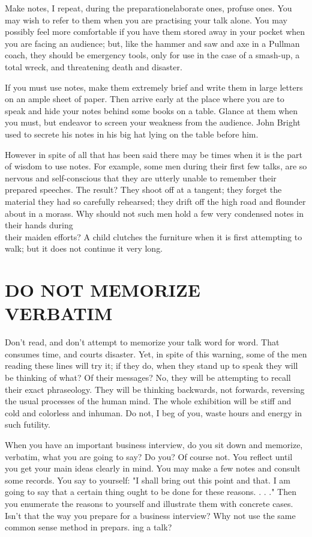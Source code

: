 \documentclass[10pt]{article}
\begin{document}
Make notes, I repeat, during the preparationelaborate ones, profuse ones. You may wish to refer to them when you are practising your talk alone. You may possibly feel more comfortable if you have them stored away in your pocket when you are facing an audience; but, like the hammer and saw and axe in a Pullman coach, they should be emergency tools, only for use in the case of a smash-up, a total wreck, and threatening death and disaster.

If you must use notes, make them extremely brief and write them in large letters on an ample sheet of paper. Then arrive early at the place where you are to speak and hide your notes behind some books on a table. Glance at them when you must, but endeavor to screen your weakness from the audience. John Bright used to secrete his notes in his big hat lying on the table before him.

However in spite of all that has been said there may be times when it is the part of wisdom to use notes. For example, some men during their first few talks, are so nervous and self-conscious that they are utterly unable to remember their prepared speeches. The result? They shoot off at a tangent; they forget the material they had so carefully rehearsed; they drift off the high road and flounder about in a morass. Why should not such men hold a few very condensed notes in their hands during\\
their maiden efforts? A child clutches the furniture when it is first attempting to walk; but it does not continue it very long.

\section*{DO NOT MEMORIZE VERBATIM}
Don't read, and don't attempt to memorize your talk word for word. That consumes time, and courts disaster. Yet, in spite of this warning, some of the men reading these lines will try it; if they do, when they stand up to speak they will be thinking of what? Of their messages? No, they will be attempting to recall their exact phraseology. They will be thinking backwards, not forwards, reversing the usual processes of the human mind. The whole exhibition will be stiff and cold and colorless and inhuman. Do not, I beg of you, waste hours and energy in such futility.

When you have an important business interview, do you sit down and memorize, verbatim, what you are going to say? Do you? Of course not. You reflect until you get your main ideas clearly in mind. You may make a few notes and consult some records. You say to yourself: "I shall bring out this point and that. I am going to say that a certain thing ought to be done for these reasons. . . ." Then you enumerate the reasons to yourself and illustrate them with concrete cases. Isn't that the way you prepare for a business interview? Why not use the same common sense method in prepars. ing a talk?
\end{document}
